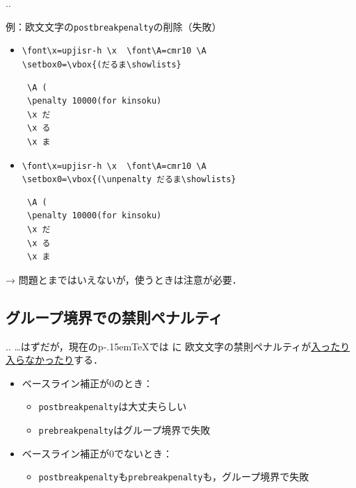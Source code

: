\documentclass[a5paper,dvipdfmx,14pt]{beamer}
\def\cs#1{\texttt{\char92\nobreak#1}}
\def\pTeX{p\kern-.15em\TeX}
\begin{document}
\begin{frame}[fragile]{\insertsectionnumber.\insertsubsectionnumber. \insertsubsection}{}
{\footnotesize\def\verbnotesize{\scriptsize}
例：欧文文字の\cs{postbreakpenalty}の削除（失敗）
\begin{itemize}
  \item \verb+\font\x=upjisr-h \x  \font\A=cmr10 \A+\\
        \verb+\setbox0=\vbox{(だるま\showlists}+
\begin{verbnote}
\begin{verbatim}
 \A (
 \penalty 10000(for kinsoku)
 \x だ
 \x る
 \x ま
\end{verbatim}
\end{verbnote}
\end{itemize}\vskip-25pt
\begin{itemize}
  \item \verb+\font\x=upjisr-h \x  \font\A=cmr10 \A+\\
        \verb+\setbox0=\vbox{(\unpenalty だるま\showlists}+
\begin{verbnote}
\begin{verbatim}
 \A (
 \penalty 10000(for kinsoku)
 \x だ
 \x る
 \x ま
\end{verbatim}
\end{verbnote}
\end{itemize}\vskip-25pt
\pause
→ 問題とまではいえないが，使うときは注意が必要．
}
\end{frame}

\subsection{グループ境界での禁則ペナルティ}\label{penagroup}
\def\ruleKINSOKUalsub{}

\begin{frame}[t,fragile]{\insertsectionnumber.\insertsubsectionnumber. \insertsubsection}
…はずだが，現在の\pTeX では
に
欧文文字の禁則ペナルティが{\SUSHI}\underline{入ったり入らなかったり}{\SUSHI}する．
\pause
\begin{itemize}\small
  \item ベースライン補正が0のとき：
    \begin{itemize}\leftskip-10pt
      \item \cs{postbreakpenalty}は大丈夫らしい
      \item \cs{prebreakpenalty}はグループ境界で失敗{\SUSHI}
    \end{itemize}
  \item ベースライン補正が0でないとき：
    \begin{itemize}\leftskip-10pt
      \item \cs{postbreakpenalty}も\cs{prebreakpenalty}も，グループ境界で失敗{\SUSHI}
    \end{itemize}
\end{itemize}
\end{frame}
\end{document}
